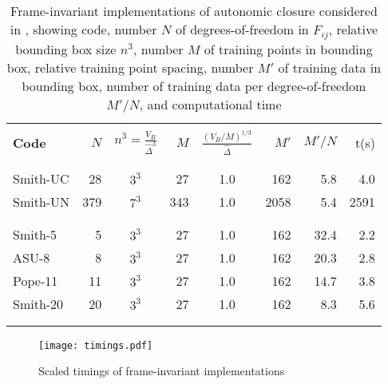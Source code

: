 %
%

\begin{table}[tb]
	\label{tab:2}
	\centering

	\caption{Frame-invariant implementations of autonomic closure considered in , showing code, number $N$ of degrees-of-freedom in $F_{ij}$, relative bounding box size $n^3$, number $M$ of training points in bounding box, relative training point spacing, number $M'$ of training data in bounding box, number of training data per degree-of-freedom $M'/N$, and computational time  \vspace{0.5cm}}

	\begin{tabular}{lrcrcrrr}
	\hline \\

	\textbf{Code} & 
	$N$ & 
	$n^3 = \frac{V_B}{\widehat{\Delta}^3}$ & 
	$M$ &
	$\frac{(V_B/M)^{1/3}}{\widehat{\Delta}}$ &
	$M'$ & 
	$M'/N$ & 
	t(s)	\\ \\

	\hline \\
		Smith-UC	&	28	&	$3^3$	&	27	&	1.0	&	162	&	5.8	& 4.0	\\
		Smith-UN	&	379	&	$7^3$	&	343	&	1.0 &	2058&	5.4	& 2591	\\ \\
	\hline \\
		Smith-5		&	5	&	$3^3$	&	27	&	1.0	&	162	&	32.4 & 2.2	\\
		ASU-8		&	8	&	$3^3$	&	27	&	1.0	&	162	&	20.3 & 2.8	\\ 
		Pope-11		&	11	&	$3^3$	&	27	&	1.0 &	162	&	14.7 & 3.8	\\ 
		Smith-20	&	20	&	$3^3$	&	27	&	1.0 &	162	&	8.3	 & 5.6	\\ \\
	\hline	\\
	\end{tabular}	
\end{table}

%
%         
%
%
\begin{figure}
	\begin{center} 
	 \texttt{[image: timings.pdf]}
	\caption{Scaled timings of frame-invariant implementations}
	\label{F:comp_time}
	\end{center}
\end{figure}
%
%
%
%
